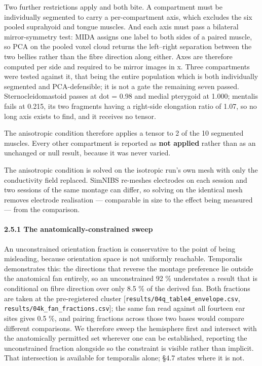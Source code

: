 \documentclass[
  11pt,
]{article}
\begin{document}
Two further restrictions apply and both bite. A compartment must be individually
segmented to carry a per-compartment axis, which excludes the six pooled
suprahyoid and tongue muscles. And each axis must pass a bilateral
mirror-symmetry test: MIDA assigns one label to both sides of a paired muscle,
so PCA on the pooled voxel cloud returns the left--right separation between the
two bellies rather than the fibre direction along either. Axes are therefore
computed per side and required to be mirror images in x. Three compartments were
tested against it, that being the entire population which is both individually
segmented and PCA-defensible; it is not a gate the remaining seven passed.
Sternocleidomastoid
passes at \textbar dot\textbar{} = 0.98 and medial pterygoid at 1.000; mentalis fails at 0.215,
its two fragments having a right-side elongation ratio of 1.07, so no long axis
exists to find, and it receives no tensor.

The anisotropic condition therefore applies a tensor to 2 of the 10 segmented
muscles. Every other compartment is reported as \textbf{not applied} rather than as
an unchanged or null result, because it was never varied.

The anisotropic condition is solved on the isotropic run's own mesh with only
the conductivity field replaced. SimNIBS re-meshes electrodes on each session
and two sessions of the same montage can differ, so solving on the identical
mesh removes electrode realisation --- comparable in size to the effect being
measured --- from the comparison.

\paragraph{2.5.1 The anatomically-constrained sweep}\label{the-anatomically-constrained-sweep}

An unconstrained orientation fraction is conservative to the point of being
misleading, because orientation space is not uniformly reachable. Temporalis
demonstrates this: the directions that reverse the montage preference lie outside
the anatomical fan entirely, so an unconstrained 92 \% understates a result that is
conditional on fibre direction over only 8.5 \% of the derived fan. Both fractions
are taken at the pre-registered cluster {[}\texttt{results/04q\_table4\_envelope.csv},
\texttt{results/04k\_fan\_fractions.csv}{]}; the same fan read against all fourteen ear sites
gives 0.5 \%, and pairing fractions across those two bases would compare different
comparisons. We therefore sweep the hemisphere first and intersect with the
anatomically permitted set wherever one can be established, reporting the
unconstrained fraction alongside so the constraint is visible rather than
implicit. That intersection is available for temporalis alone; §4.7 states where
it is not.
\end{document}
